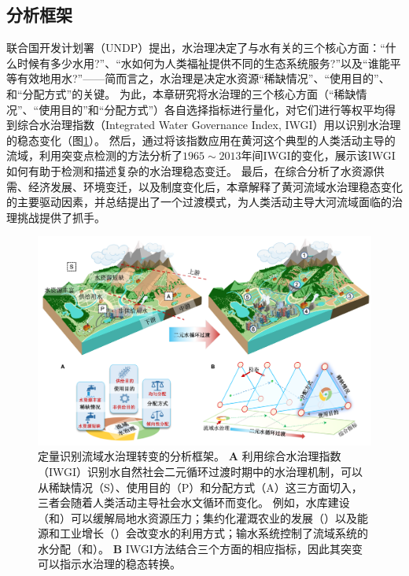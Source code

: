 
\subsection{分析框架}

联合国开发计划署（UNDP）提出\cite{mariajacobson2013}，水治理决定了与水有关的三个核心方面：``什么时候有多少水用?''、``水如何为人类福祉提供不同的生态系统服务?''以及``谁能平等有效地用水?''——简而言之，水治理是决定水资源``稀缺情况''、``使用目的''、和``分配方式''的关键。
为此，本章研究将水治理的三个核心方面（``稀缺情况''、``使用目的''和``分配方式''）各自选择指标进行量化，对它们进行等权平均得到综合水治理指数（Integrated Water Governance Index, IWGI）用以识别水治理的稳态变化（图\ref{ch4:fig:framework}）。
然后，通过将该指数应用在黄河这个典型的人类活动主导的流域，利用突变点检测的方法分析了$1965\sim2013$年间IWGI的变化，展示该IWGI如何有助于检测和描述复杂的水治理稳态变迁。
最后，在综合分析了水资源供需、经济发展、环境变迁，以及制度变化后，本章解释了黄河流域水治理稳态变化的主要驱动因素，并总结提出了一个过渡模式，为人类活动主导大河流域面临的治理挑战提供了抓手。

\begin{figure}[!ht]
\centering
\includegraphics[width=\textwidth]{img/ch4/ch4_framework.png}
\caption[定量识别流域水治理转变的分析框架]{
    定量识别流域水治理转变的分析框架。
    \textbf{A} 利用综合水治理指数（IWGI）识别水自然\textendash{}社会二元循环过渡时期中的水治理机制，可以从稀缺情况（S）、使用目的（P）和分配方式（A）这三方面切入，三者会随着人类活动主导社会\textendash{}水文循环而变化。
    例如，水库建设（和）可以缓解局地水资源压力；集约化灌溉农业的发展（）以及能源和工业增长（）会改变水的利用方式；输水系统控制了流域系统的水分配（和）。
    \textbf{B} IWGI方法结合三个方面的相应指标，因此其突变可以指示水治理的稳态转换。}\label{ch4:fig:framework}
\end{figure}

